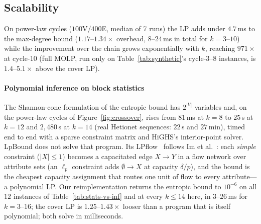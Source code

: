 \documentclass[conference]{IEEEtran}
\begin{document}
\subsection{Scalability}
\label{sec:scalability}

On power-law cycles ($100$V/$400$E, median of 7 runs) the
LP adds under $4.7$\,ms to the max-degree bound ($1.17$--$1.34\times$
overhead, $8$--$24$\,ms in total for $k{=}3$--$10$) while the
improvement over the chain grows exponentially with $k$, reaching $971\times$ at
cycle-10 (full MOLP, run only on Table~\ref{tab:synthetic}'s cycle-$3$--$8$ instances, is $1.4$--$5.1\times$ above the cover LP).

\paragraph{Polynomial inference on block statistics}
The Shannon-cone formulation of the entropic bound has $2^{|V|}$
variables and, on the power-law cycles of Figure~\ref{fig:crossover},
rises from $81$\,ms at $k{=}8$ to $25$\,s at $k{=}12$ and $2{,}480$\,s
at $k{=}14$ (real Hetionet sequences: $22$\,s and $27$\,min), timed end
to end with a sparse constraint matrix and HiGHS's interior-point solver. LpBound does not solve that program. Its LPflow~\cite[Thm.~4.5]{zhang2025lpbound}
follows Im et al.~\cite{im2025simple}: each \emph{simple} constraint
($|X| \le 1$) becomes a capacitated edge $X \to Y$ in a flow network
over attribute sets (an $\ell_p$ constraint adds $\emptyset \to X$ at
capacity $\delta/p$), and the bound is the cheapest capacity assignment
that routes one unit of flow to every attribute---a polynomial LP. Our
reimplementation returns the entropic bound to $10^{-6}$ on all $12$
instances of Table~\ref{tab:stats-vs-inf} and at every $k \le 14$
here, in $3$--$26$\,ms for $k{=}3$--$16$; the cover LP is
$1.25$--$1.43\times$ looser than a program that is itself polynomial;
both solve in milliseconds.
\end{document}
